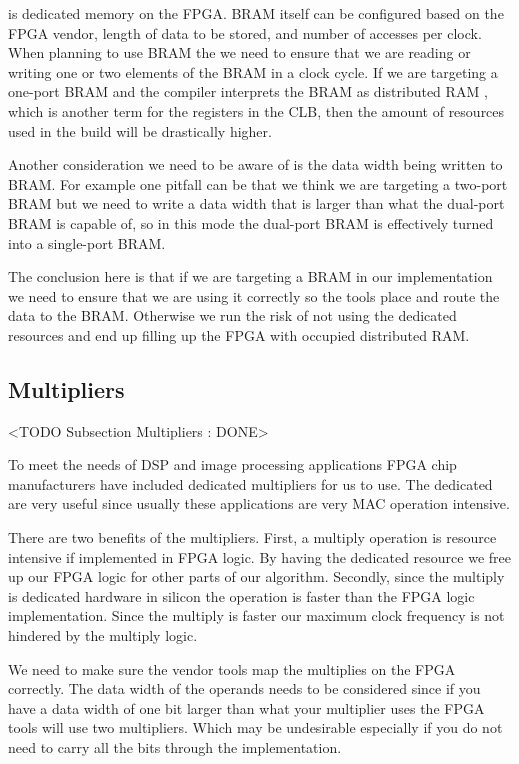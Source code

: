 is dedicated memory on the \ac{FPGA}. \ac{BRAM} itself can be configured based on the \ac{FPGA} vendor, length of data to be stored, and number of accesses per clock. When planning to use \ac{BRAM} the we need to ensure that we are reading or writing one or two elements of the \ac{BRAM} in a clock cycle. If we are targeting a one-port \ac{BRAM} and the compiler interprets the \ac{BRAM} as distributed \ac{RAM} , which is another term for the registers in the \ac{CLB}, then the amount of resources used in the build will be drastically higher.

Another consideration we need to be aware of is the data width being written to \ac{BRAM}. For example one pitfall can be that we think we are targeting a two-port \ac{BRAM} but we need to write a data width that is larger than what the dual-port \ac{BRAM} is capable of, so in this mode the dual-port \ac{BRAM} is effectively turned into a single-port \ac{BRAM}. 

The conclusion here is that if we are targeting a \ac{BRAM} in our implementation we need to ensure that we are using it correctly so the tools place and route the data to the \ac{BRAM}. Otherwise we run the risk of not using the dedicated resources and end up filling up the \ac{FPGA} with occupied distributed \ac{RAM}.

\subsection{Multipliers}
	<TODO Subsection Multipliers : DONE> 

To meet the needs of \ac{DSP} and image processing applications \ac{FPGA} chip manufacturers have included dedicated multipliers for us to use. The dedicated  are very useful since usually these applications are very \ac{MAC} operation intensive. 

There are two benefits of the multipliers. First, a multiply operation is resource intensive if implemented in \ac{FPGA} logic. By having the dedicated resource we free up our \ac{FPGA} logic for other parts of our algorithm. Secondly, since the multiply is dedicated hardware in silicon the operation is faster than the \ac{FPGA} logic implementation. Since the multiply is faster our maximum clock frequency is not hindered by the multiply logic. 
	
We need to make sure the vendor tools map the multiplies on the \ac{FPGA} correctly. The data width of the operands needs to be considered since if you have a data width of one bit larger than what your multiplier uses the \ac{FPGA} tools will use two multipliers. Which may be undesirable especially if you do not need to carry all the bits through the implementation. 


